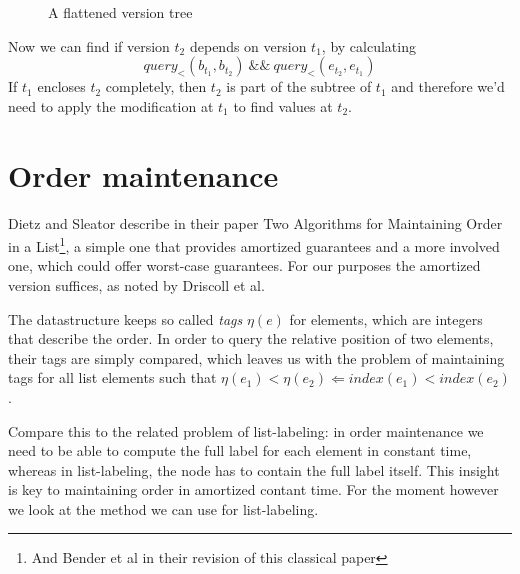 \documentclass[11pt,a4paper,twoside,openright]{Thesis}
\theoremstyle{definition}
\newcommand{\seclabel}[1]{\label{sec:#1}}
\begin{document}
\begin{figure}[htpb]
  \caption{A flattened version tree}
  \label{fig:flattening-tree}
\end{figure}

Now we can find if version $t_2$ depends on version $t_1$, by calculating 
\[ query_<(b_{t_1}, b_{t_2})\ \mathrm{\&\&}\ query_<(e_{t_2}, e_{t_1})\]
If $t_1$ encloses $t_2$ completely, then $t_2$ is part of the subtree of $t_1$
and therefore we'd need to apply the modification at $t_1$ to find values at
$t_2$.

\section{Order maintenance}\seclabel{order-maintenance}
Dietz and Sleator describe in their paper Two Algorithms for Maintaining 
Order in a List\cite{Diet87b}\footnote{And Bender et al\cite{Bend02a} in 
their revision of this classical paper}, a simple one that provides amortized 
guarantees and a more involved one, which could offer worst-case guarantees. 
For our purposes the amortized version suffices, as noted by Driscoll et
al\cite[p. 108]{Dris89a}.

The datastructure keeps so called \emph{tags} $\eta(e)$ for elements, which are 
integers that describe the order. In order to query the relative position of 
two elements, their tags are simply compared, which leaves us with the 
problem of maintaining tags for all list elements such that 
$\eta(e_1)<\eta(e_2) \Leftarrow index(e_1) < index(e_2)$.

Compare this to the related problem of list-labeling: in order maintenance we 
need to be able to compute the full label for each element in constant time, 
whereas in list-labeling, the node has to contain the full label itself. This 
insight is key to maintaining order in amortized contant time. For the moment 
however we look at the method we can use for list-labeling.
\end{document}
